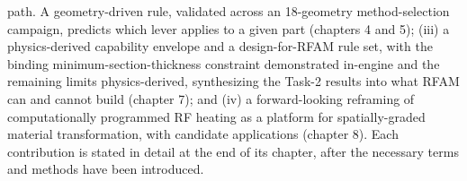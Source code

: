 path. A geometry-driven rule, validated across an 18-geometry method-selection
campaign, predicts which lever applies to a given part
(chapters 4 and 5); (iii) a
physics-derived capability envelope and a design-for-RFAM rule set, with the binding
minimum-section-thickness constraint demonstrated in-engine and the remaining limits
physics-derived, synthesizing the Task-2 results into what RFAM can and cannot build
(chapter 7); and (iv) a forward-looking reframing of
computationally programmed RF heating as a platform for spatially-graded material
transformation, with candidate applications (chapter 8).
Each contribution is stated in detail at the end of its chapter, after the
necessary terms and methods have been introduced.
